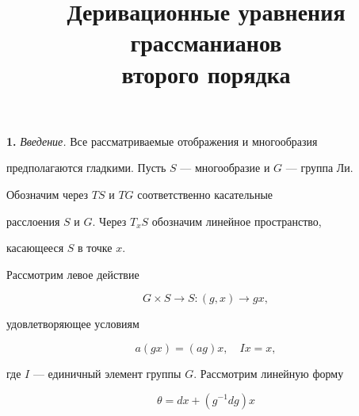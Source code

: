 

\title{Деривационные уравнения грассманианов\\


второго порядка}





\date{}







\pagestyle{plain} %













\maketitle


\label{begin}








{\bf 1.} {\it Введение.} Все рассматриваемые отображения и многообразия


предполагаются гладкими. Пусть $S$ --- многообразие и $G$ --- группа Ли.


Обозначим через $TS$ и $TG$ соответственно касательные


расслоения $S$ и $G$. Через $T_x S$ обозначим линейное пространство,


касающееся $S$ в точке $x$.


Рассмотрим левое действие


\begin{equation}


G \times S \to S: (g,x) \to gx,


\end{equation}


удовлетворяющее условиям


$$


a(gx) = (ag)x,\quad Ix = x,


$$


где $I$ --- единичный элемент группы $G$. Рассмотрим линейную форму


\begin{equation}


\theta = dx + (g^{-1}dg)x


\end{equation}


